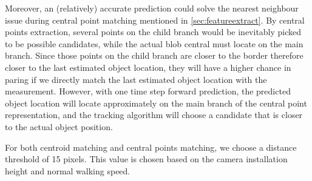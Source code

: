 Moreover, an (relatively) accurate prediction could solve the nearest neighbour issue during central point matching mentioned in \autoref{sec:featureextract}. By central points extraction, several points on the child branch would be inevitably picked to be possible candidates, while the actual blob central must locate on the main branch. Since those points on the child branch are closer to the border therefore closer to the last estimated object location, they will have a higher chance in paring if we directly match the last estimated object location with the measurement. However, with one time step forward prediction, the predicted object location will locate approximately on the main branch of the central point representation, and the tracking algorithm will choose a candidate that is closer to the actual object position.

For both centroid matching and central points matching, we choose a distance threshold of 15 pixels. This value is chosen based on the camera installation height and normal walking speed.

